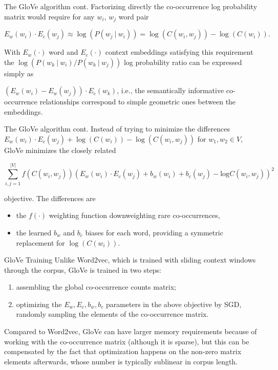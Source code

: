 \documentclass[style=upen, size=14pt]{powerdot}
\theoremstyle{definition}
\begin{document}
\begin{slide}[toc=]{The GloVe algorithm cont.} 
  Factorizing directly the co-occurrence log probability matrix would require
  for any $w_i$, $w_j$ word pair
  \begin{small}
    $$
    E_w(w_i)\cdot E_c(w_j)\approx \log (P(w_j~|~ w_i)) = \log (C(w_i, w_j)) - \log (C(w_i)).
    $$
  \end{small}
  With $E_w(\cdot)$ word and $E_c(\cdot)$ context embeddings satisfying this
  requirement the $\log(P(w_k~|~w_i)/P(w_k~|~w_j))$ log probability ratio can be
  expressed simply as

  $(E_w(w_i) - E_w(w_j))\cdot E_c(w_k)$, i.e., the semantically informative
  co-occurrence relationships correspond to simple geometric ones between the embeddings.
\end{slide}

\begin{slide}[toc=]{The GloVe algorithm cont.}
  Instead of trying to minimize the differences
  $E_w(w_i) \cdot E_c(w_j) + \log (C(w_i)) - \log (C(w_i, w_j))$ for
  $w_1,w_2\in V$, GloVe minimizes the closely related
  \begin{small}
  $$
  \sum\limits_{i, j=1}^{|V|} f(C(w_i,w_j)) (E_w(w_i)\cdot E_c({w}_j) + b_w(w_i) +
  {b_c}(w_j) - \text{log} C(w_i, w_j))^2
  $$
  \end{small}
  objective. The differences are
  \begin{itemize}
  \item the $f(\cdot)$ weighting function downweighting rare co-occurrences,
  \item the learned $b_w$ and $b_c$ biases for each word, providing a symmetric
    replacement for $\log(C(w_i))$.
  \end{itemize}
\end{slide}

\begin{slide}[toc=]{GloVe Training}
  Unlike Word2vec, which is trained with sliding context windows through the
  corpus, GloVe is trained in two steps:
  \begin{enumerate}
  \item assembling the global co-occurrence counts matrix;
  \item optimizing the $E_w, E_c, b_w, b_c$ parameters in the above objective by
    SGD, randomly sampling the elements of the co-occurrence matrix.
  \end{enumerate}
  Compared to Word2vec, GloVe can have larger memory requirements because of
  working with the co-occurrence matrix (although it is sparse), but this can be
  compensated by the fact that optimization happens on the non-zero matrix
  elements afterwards, whose number is typically sublinear in corpus length.
\end{slide}
\end{document}
